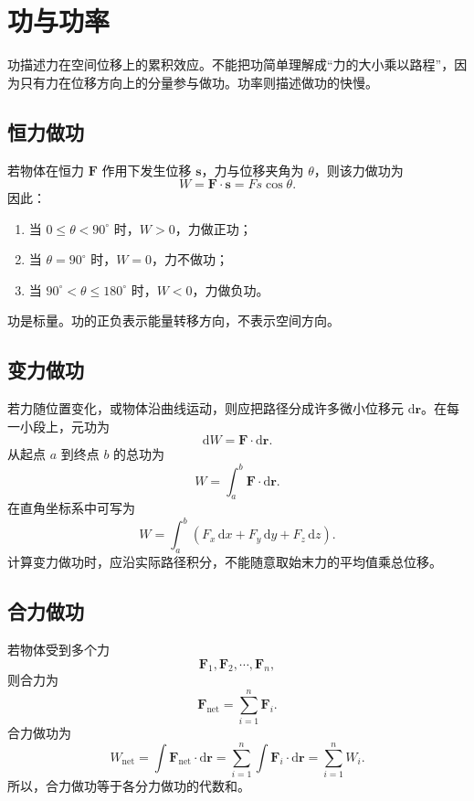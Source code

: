 \section{功与功率}

功描述力在空间位移上的累积效应。不能把功简单理解成“力的大小乘以路程”，因为只有力在位移方向上的分量参与做功。功率则描述做功的快慢。

\subsection{恒力做功}

若物体在恒力 $\boldsymbol F$ 作用下发生位移 $\boldsymbol s$，力与位移夹角为 $\theta$，则该力做功为
\[
    W=\boldsymbol F\cdot\boldsymbol s=Fs\cos\theta .
\]
因此：

\begin{enumerate}
    \item 当 $0\leq \theta<90^\circ$ 时，$W>0$，力做正功；
    \item 当 $\theta=90^\circ$ 时，$W=0$，力不做功；
    \item 当 $90^\circ<\theta\leq 180^\circ$ 时，$W<0$，力做负功。
\end{enumerate}

功是标量。功的正负表示能量转移方向，不表示空间方向。

\subsection{变力做功}

若力随位置变化，或物体沿曲线运动，则应把路径分成许多微小位移元 $\mathrm d\boldsymbol r$。在每一小段上，元功为
\[
    \mathrm dW=\boldsymbol F\cdot\mathrm d\boldsymbol r .
\]
从起点 $a$ 到终点 $b$ 的总功为
\[
    \boxed{
    W=\int_a^b\boldsymbol F\cdot\mathrm d\boldsymbol r
    } .
\]
在直角坐标系中可写为
\[
    W=\int_a^b
    \left(
    F_x\,\mathrm dx+F_y\,\mathrm dy+F_z\,\mathrm dz
    \right).
\]
计算变力做功时，应沿实际路径积分，不能随意取始末力的平均值乘总位移。

\subsection{合力做功}

若物体受到多个力
\[
    \boldsymbol F_1,\boldsymbol F_2,\cdots,\boldsymbol F_n,
\]
则合力为
\[
    \boldsymbol F_{\mathrm{net}}=\sum_{i=1}^{n}\boldsymbol F_i .
\]
合力做功为
\[
    W_{\mathrm{net}}
    =
    \int \boldsymbol F_{\mathrm{net}}\cdot\mathrm d\boldsymbol r
    =
    \sum_{i=1}^{n}
    \int \boldsymbol F_i\cdot\mathrm d\boldsymbol r
    =
    \sum_{i=1}^{n}W_i .
\]
所以，合力做功等于各分力做功的代数和。

